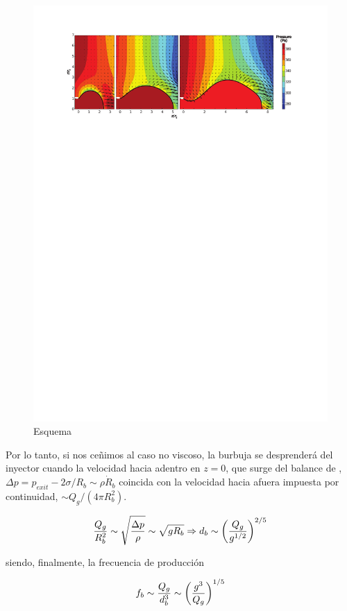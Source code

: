 \begin{figure}[hbtp!]
\includegraphics[width=.75\textwidth]{figuras/esquemaBurbuja.pdf}
\caption{Esquema}
\end{figure}

Por lo tanto, si nos ceñimos al caso no viscoso, la burbuja se desprenderá del inyector cuando la velocidad hacia adentro en $z = 0$, que surge del balance de , $\Delta p = p_{exit} - 2\sigma/R_{b} \sim \rho \dot{R}_{b}$ coincida con la velocidad hacia afuera impuesta por continuidad, $\sim Q_{g}/\left(4\pi R_{b}^{2}\right)$.

\begin{equation}\LABEQ{dbestimado}
\dfrac{Q_{g}}{R_{b}^{2}} \sim 	\sqrt{\dfrac{\Delta p}{\rho}} \sim \sqrt{g R_{b}} \Rightarrow d_{b} \sim \left(\dfrac{Q_{g}}{g^{1/2}}\right)^{2/5}
\end{equation}

siendo, finalmente, la frecuencia de producción 

\begin{equation}\LABEQ{fbestimado}
f_{b}\sim \dfrac{Q_{g}}{d_{b}^{3}} \sim	\left(\dfrac{g^{3}}{Q_{g}}\right)^{1/5}
\end{equation}

